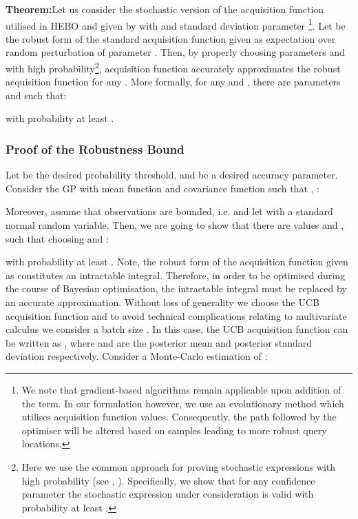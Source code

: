 \documentclass[jair,twoside,11pt,theapa]{article}
\let\cite\shortcite
\theoremstyle{definition}
\newenvironment{theorem}[1]{\par\noindent\textbf{Theorem:}\space#1}{}
\begin{document}
\begin{theorem}
Let us consider the  stochastic version of the acquisition function utilised in HEBO and given by  with  and  standard deviation parameter  \footnote{We note that gradient-based algorithms remain applicable upon addition of the  term. In our formulation however, we use an evolutionary method which utilises acquisition function values. Consequently, the path followed by the optimiser will be altered based on  samples leading to more robust query locations.}. Let  be the robust form of the standard acquisition function given as expectation over random perturbation of parameter . Then, by properly choosing parameters  and   with high probability\footnote{Here we use the common approach for proving stochastic expressions with high probability (see \cite{jordan_cubic}, \cite{AZ01}). Specifically, we show that for any confidence parameter    the stochastic expression under consideration is valid with probability at least .},  acquisition function   accurately approximates the robust acquisition function  for any . More formally, for any  and , there are parameters  and  such that:    

with probability at least .\\ 
\end{theorem}



\subsubsection{Proof of the Robustness Bound}\label{sec:prooflemma}



Let  be the desired probability threshold, and  be a desired accuracy parameter. Consider the GP with mean function  and covariance function  such that , :  

Moreover, assume that observations  are bounded, i.e.  and let  with  a standard normal random variable. Then, we are going to show that there are values  and , such that choosing   and : 

with probability at least . Note, the robust form of the acquisition function given as  constitutes an intractable integral. Therefore, in order to be optimised during the course of Bayesian optimisation, the intractable integral must be replaced by an accurate approximation. Without loss of generality we choose the UCB acquisition function   and to avoid technical complications relating to multivariate calculus we consider a batch size .
In this case, the UCB acquisition function can be written as , where  and  are the posterior mean and posterior standard deviation respectively. Consider a Monte-Carlo estimation of
:
\end{document}
